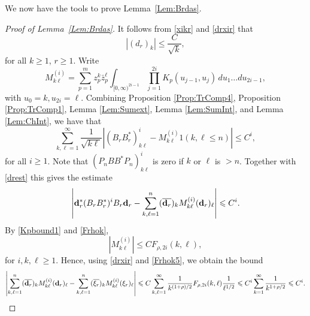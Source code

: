 \documentclass{article}
\numberwithin{equation}{section}
\numberwithin{figure}{section}
\theoremstyle{plain}
\theoremstyle{plain}
\numberwithin{thm}{section}
\theoremstyle{remark}
\let \le \leqslant
\let \ge \geqslant
\begin{document}
We now have the tools to prove Lemma~\ref{Lem:Brdas}.
\begin{proof}[Proof of Lemma~\ref{Lem:Brdas}]
    It follows from \eqref{xikr} and \eqref{drxir} that
    \begin{equation}\label{drest}
        |(d_r)_k|\le \frac{C}{\sqrt{k}},
    \end{equation}
    for all $k\ge 1$, $r\ge 1$. Write
    \begin{equation}\label{Mkl}
     M^{(i)}_{k\ell}=\sum_{p=1}^mz_p^k\bar{z}_p^\ell\int_{[0,\infty)^{2i-1}}
     \prod_{j=1}^{2i}K_p(u_{j-1},u_j)\,du_1\dots du_{2i-1},
    \end{equation}
with $u_0=k, u_{2i}=\ell$. Combining Proposition \ref{Prop:TrComp4}, Proposition \ref{Prop:TrComp1}, Lemma \ref{Lem:Sumext}, Lemma \ref{Lem:SumInt}, and Lemma \ref{Lem:ChInt}, we have that
\begin{equation*}
    \sum_{k,\ell=1}^\infty \frac 1{\sqrt{k\ell}}|(B_rB_r^*)^i_{k\ell}-M^{(i)}_{k\ell}1(k,\ell\le n)|\le C^i,
\end{equation*}
for all $i\ge 1$. Note that $(P_nBB^*P_n)^i_{k\ell}$ is zero if $k$ or $\ell$ is $>n$. Together with \eqref{drest} this gives the estimate
\begin{equation*}
    \left|{\bf d}_r^*(B_rB_r^*)^iB_r{\bf d}_r-\sum_{k,\ell=1}^n(\overline{{\bf d}_r})_kM^{(i)}_{k\ell}({\bf d}_r)_\ell\right|\le C^i.
\end{equation*}
By \eqref{Kpbound1} and \eqref{Frhok},
\begin{equation}\label{Mklbound}
    |M^{(i)}_{k\ell}|\le CF_{\rho,2i}(k,\ell),
\end{equation}
for $i,k,\ell\ge 1$. Hence, using \eqref{drxir} and \eqref{Frhok5}, we obtain the bound
\begin{equation*}
    \left|\sum_{k,\ell=1}^n(\overline{{\bf d}_r})_kM^{(i)}_{k\ell}({\bf d}_r)_\ell-\sum_{k,\ell=1}^n(\overline{\xi_r})_kM^{(i)}_{k\ell}(\xi_r)_\ell\right|\le C\sum_{k,\ell=1}^\infty \frac 1{k^{(1+\rho)/2}}F_{\rho,2i}(k,\ell)\frac 1{\ell^{1/2}}\le C^i\sum_{k=1}^\infty \frac 1{k^{1+\rho/2}}\le C^i.
\end{equation*}


\end{proof}
\end{document}

